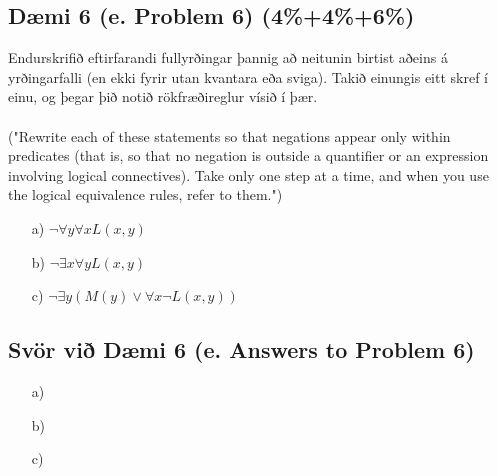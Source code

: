\newpage
\subsection*{Dæmi 6 (e. Problem 6) (4\%+4\%+6\%) \label{section:daemi6}}
Endurskrifið eftirfarandi fullyrðingar þannig að neitunin birtist aðeins á yrðingarfalli (en ekki fyrir utan kvantara eða sviga). Takið einungis eitt skref í einu, og þegar þið notið rökfræðireglur vísið í þær. \\ \\ 
("Rewrite each of these statements so that negations appear only within predicates (that is, so that no negation is outside a quantifier or an expression involving logical connectives). Take only one step at a time, and when you use the logical equivalence rules, refer to them.")
\begin{itemize}
    \item[a)] $\neg \forall y \forall x L(x, y)$
    \item[b)] $\neg \exists x \forall y L(x, y)$
    \item[c)] $\neg \exists y (M (y) \lor \forall x \neg L(x, y))$ 
\end{itemize}
\subsection*{Svör við Dæmi 6 (e. Answers to Problem 6)}

\newcommand{\makeAnswerBoxProblemSixA}{
  \begin{tcolorbox}[colframe=black, colback=white, boxrule=0.5pt, arc=0pt, outer arc=0pt, height=3.5cm, width=\linewidth, top=1mm, bottom=1mm, left=1mm, right=1mm]

    
  \end{tcolorbox}
}

\newcommand{\makeAnswerBoxProblemSixB}{
  \begin{tcolorbox}[colframe=black, colback=white, boxrule=0.5pt, arc=0pt, outer arc=0pt, height=3.5cm, width=\linewidth, top=1mm, bottom=1mm, left=1mm, right=1mm]

    
  \end{tcolorbox}
}

\newcommand{\makeAnswerBoxProblemSixC}{
  \begin{tcolorbox}[colframe=black, colback=white, boxrule=0.5pt, arc=0pt, outer arc=0pt, height=3.5cm, width=\linewidth, top=1mm, bottom=1mm, left=1mm, right=1mm]

    
  \end{tcolorbox}
}

\begin{itemize}
    \item[a)] \makeAnswerBoxProblemSixA
    \item[b)] \makeAnswerBoxProblemSixB
    \item[c)] \makeAnswerBoxProblemSixC
\end{itemize}